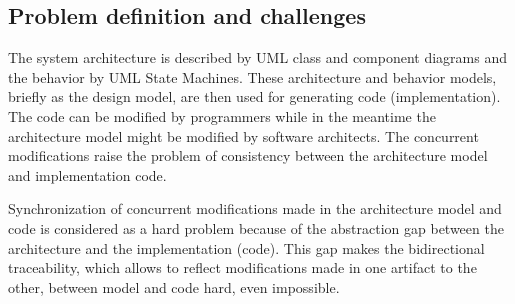 \subsection{Problem definition and challenges}
\label{subsec:problemdefinition}
The system architecture is described by UML class and component diagrams and the behavior by UML State Machines.
These architecture and behavior models, briefly as the design model, are then used for generating code (implementation).
The code can be modified by programmers while in the meantime the architecture model might be modified by software architects.
The concurrent modifications raise the problem of consistency between the architecture model and implementation code.

Synchronization of concurrent modifications made in the architecture model and code is considered as a hard problem because of the abstraction gap between the architecture and the implementation (code). 
This gap makes the bidirectional traceability, which allows to reflect modifications made in one artifact to the other, between model and code hard, even impossible.
